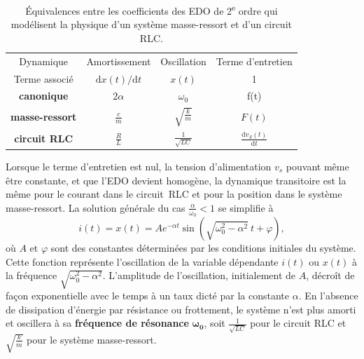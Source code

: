 \documentclass[canadien,12pt,oneside,letterpaper]{article}
\begin{document}
\begin{table}[h]
\centering
\begin{tabular}{c|ccc}
\hline
Dynamique & Amortissement & Oscillation & Terme d'entretien \\
Terme associé & $\mathrm{d}x(t)/\mathrm{d}t$ & $x(t)$ & 1\\
\hline
\textbf{canonique} & $2\alpha$ & $\omega_0$ & f(t)\\
\textbf{masse-ressort} & $\displaystyle\frac{c}{m}$ & $\displaystyle\sqrt{\frac{k}{m}}$ & $F(t)$ \\
\textbf{circuit RLC} & $\displaystyle\frac{R}{L}$ & $\displaystyle\frac{1}{\sqrt{LC}}$ & $\displaystyle\frac{\mathrm{d}v_S(t)}{\mathrm{d}t}$ \\
\hline
\end{tabular}
\caption{Équivalences entre les coefficients des EDO de 2\textsuperscript{e} ordre qui modélisent la physique d'un système masse-ressort et d'un circuit RLC.}
\label{tab:equiv_masse_ressort}
\end{table}

Lorsque le terme d'entretien est nul, la tension d'alimentation $v_s$ pouvant même être constante, et que l'EDO devient homogène, la dynamique transitoire est la même pour le courant dans le circuit~RLC et pour la position dans le système masse-ressort. La solution générale du cas $\frac{\alpha}{\omega_0}<1$ se simplifie à
\begin{equation}\label{eq:sol_gen}
   i(t) = x(t) = Ae^{-\alpha t}\sin\left(\sqrt{\omega_0^2-\alpha^2}\:t+\varphi\right), 
\end{equation}
où $A$ et $\varphi$ sont des constantes déterminées par les conditions initiales du système. Cette fonction représente l'oscillation de la variable dépendante $i(t)$ ou $x(t)$ à la fréquence $\sqrt{\omega_0^2-\alpha^2}$. L'amplitude de l'oscillation, initialement de $A$, décroît de façon exponentielle avec le temps à un taux dicté par la constante $\alpha$. En l'absence de dissipation d'énergie par résistance ou frottement, le système n'est plus amorti et oscillera à sa \textbf{fréquence de résonance} $\mathbf{\omega_0}$, soit $\frac{1}{\sqrt{LC}}$ pour le circuit RLC et $\sqrt{\frac{k}{m}}$ pour le système masse-ressort. 
\end{document}
